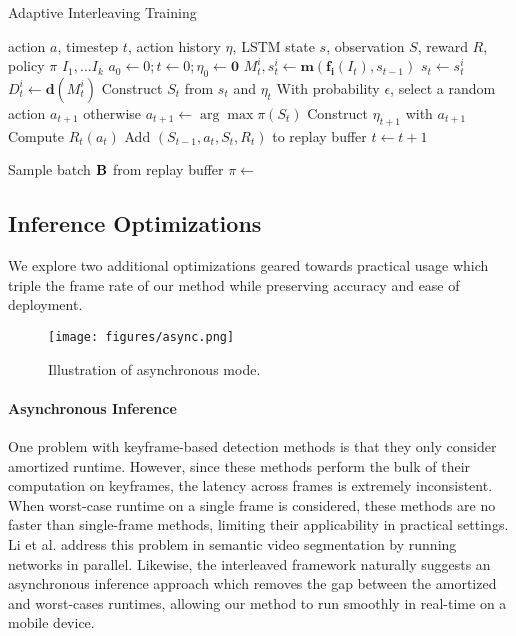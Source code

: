 \documentclass[10pt,twocolumn,letterpaper]{article}
\begin{document}
\begin{algorithm}
\caption{Adaptive Interleaving Training}
\renewcommand{\algorithmicrequire}{\textbf{Define:}}
\begin{algorithmic}[1]
\Require action $a$, timestep $t$, action history $\eta$, LSTM state $s$, observation $S$, reward $R$, policy $\pi$
\Repeat
\label{alg:training}
\State {} $I_1, \ldots I_k$
\State $a_0 \gets 0; t \gets 0; \eta_0 \gets \mathbf{0}$
\State $M^i_t, s^i_t \gets \mathbf{m}(\mathbf{f_i}(I_t), s_{t-1})$
\State $s_t \gets s^i_t$
\EndIf
\State $D^i_t \gets \mathbf{d}(M^i_t)$
\EndFor
\State Construct $S_t$ from $s_t$ and $\eta_t$
\State With probability $\epsilon$, select a random action $a_{t+1}$
\State otherwise $a_{t+1} \gets \arg\max\pi(S_t)$
\State Construct $\eta_{t+1}$ with $a_{t+1}$
\State Compute $R_t(a_t)$
\State Add $(S_{t-1}, a_t, S_t, R_t)$ to replay buffer
\State $t \gets t + 1$
\EndWhile

\State Sample batch $\bf{B}$ from replay buffer
\State $\pi \gets$  
\end{algorithmic}
\end{algorithm}

\subsection{Inference Optimizations}
We explore two additional optimizations geared towards practical usage which triple the frame rate of our method while preserving accuracy and ease of deployment.

\begin{figure}[ht]
\begin{center}
  \texttt{[image: figures/async.png]}
  \vspace{-2em}
\end{center}
  \caption{Illustration of asynchronous mode.}
\label{fig:async}
\vspace{-0.5cm}
\end{figure}

\paragraph{\textbf{Asynchronous Inference}} One problem with keyframe-based detection methods is that they only consider amortized runtime. However, since these methods perform the bulk of their computation on keyframes, the latency across frames is extremely inconsistent. When worst-case runtime on a single frame is considered, these methods are no faster than single-frame methods, limiting their applicability in practical settings. Li et al. \cite{li2018low} address this problem in semantic video segmentation by running networks in parallel. Likewise, the interleaved framework naturally suggests an asynchronous inference approach which removes the gap between the amortized and worst-cases runtimes, allowing our method to run smoothly in real-time on a mobile device.
\end{document}
